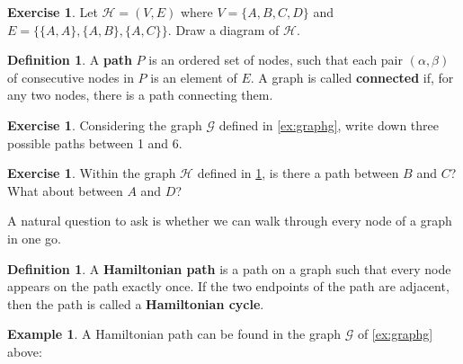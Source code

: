 \documentclass[a4paper, 10pt]{amsart}
\theoremstyle{definition}
\newtheorem{defn}[thm]{Definition}
\newtheorem{ex}[thm]{Example}
\newtheorem{exercise}[thm]{Exercise}
\theoremstyle{remark}
\begin{document}
\begin{exercise}\label{ex:graphh}
  Let $ \mathcal{H} = (V, E) $ where $ V = \{A, B, C, D\} $ and $ E = \{ \{A, A\},\allowbreak \{A, B\},\allowbreak \{A, C\} \} $. Draw a diagram of $ \mathcal{H} $.
\end{exercise}

\begin{defn}
  A \textbf{path} $ P $ is an ordered set of nodes, such that each pair $ (\alpha, \beta) $ of consecutive nodes in $ P $ is an element of $ E $.
  A graph is called \textbf{connected} if, for any two nodes, there is a path connecting them.
\end{defn}

\begin{exercise}
  Considering the graph $ \mathcal{G} $ defined in \cref{ex:graphg}, write down three possible paths between 1 and 6.
\end{exercise}

\begin{exercise}
  Within the graph $ \mathcal{H} $ defined in \cref{ex:graphh}, is there a path between $ B $ and $ C $? What about between $ A $ and $ D $?
\end{exercise}

A natural question to ask is whether we can walk through every node of a graph in one go.

\begin{defn}
  A \textbf{Hamiltonian path} is a path on a graph such that every node appears on the path exactly once. If the two endpoints
  of the path are adjacent, then the path is called a \textbf{Hamiltonian cycle}.
\end{defn}

\begin{ex}
  A Hamiltonian path can be found in the graph $ \mathcal{G} $ of \cref{ex:graphg} above:
  \begin{center}
  \end{center}
\end{ex}
\end{document}
